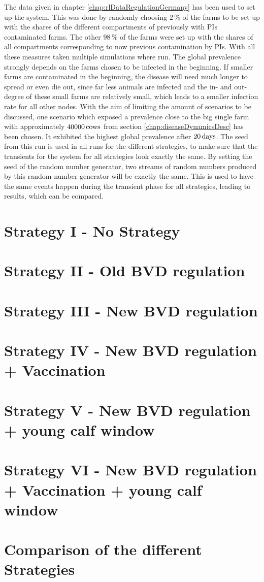 The data given in chapter \ref {chap:rlDataRegulationGermany} has been used to set up the system. This was done by randomly choosing $2\,\%$ of the farms to be set up with the shares of the different compartments of previously with PIs contaminated farms. The other $98\,\%$ of the farms were set up with the shares of all compartments corresponding to now previous contamination by PIs. With all these measures taken multiple simulations where run. The global prevalence strongly depends on the farms chosen to be infected in the beginning. If smaller farms are contaminated in the beginning, the disease will need much longer to spread or even die out, since far less animals are infected and the in- and out-degree of these small farms are relatively small, which leads to a smaller infection rate for all other nodes. With the aim of limiting the amount of scenarios to be discussed, one scenario which exposed a prevalence close to the big single farm with approximately $40000\,\text{cows}$ from section \ref{chap:diseaseDynamicsDesc} has been chosen. It exhibited the highest global prevalence after $20\,\text{days}$. The seed from this run is used in all runs for the different strategies, to make sure that the transients for the system for all strategies look exactly the same. By setting the seed of the random number generator, two streams of random numbers produced by this random number generator will be exactly the same. This is used to have the same events happen during the transient phase for all strategies, leading to results, which can be compared.
\section{Strategy I - No Strategy}

\section{Strategy II - Old BVD regulation}
\section{Strategy III - New BVD regulation}
\section{Strategy IV - New BVD regulation + Vaccination}
\section{Strategy V - New BVD regulation + young calf window}
\section{Strategy VI - New BVD regulation + Vaccination + young calf window} 
\section{Comparison of the different Strategies}